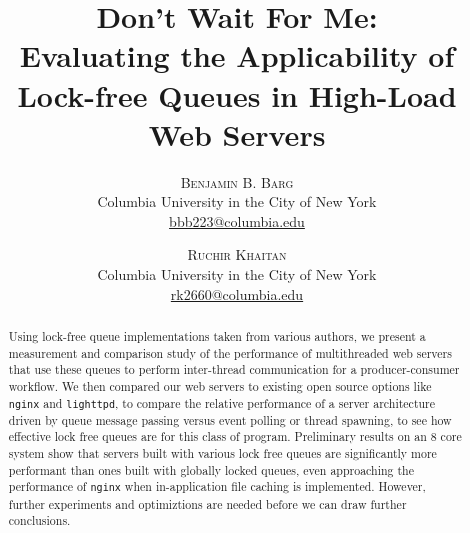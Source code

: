 \documentclass[twoside]{article}
\title{\vspace{-15mm}%
  \fontsize{24pt}{10pt}\selectfont \textbf{Don't Wait For Me:}\\
  \textbf{Evaluating the Applicability of Lock-free Queues in High-Load Web
    Servers} }
\author{%
  \large
  \textsc{Benjamin B. Barg}\\[2mm]
  \normalsize	Columbia University in the City of New York \\
  \normalsize \href{mailto:bbb2123@columbia.edu}{bbb223@columbia.edu}
  \and
  \large
  \textsc{Ruchir Khaitan}\\[2mm]
  \normalsize	Columbia University in the City of New York \\
  \normalsize \href{mailto:rk2660@columbia.edu}{rk2660@columbia.edu}
  \vspace{-5mm} }
\date{}
\begin{document}
\maketitle
\thispagestyle{fancy}

\begin{abstract}
  \noindent Using lock-free queue implementations taken from various
  authors, we present a measurement and comparison study of the
  performance of multithreaded web servers that use these queues to
  perform inter-thread communication for a producer-consumer
  workflow. We then compared our web servers to existing open source
  options like \verb+nginx+ and \verb+lighttpd+, to compare the
  relative performance of a server architecture driven by queue
  message passing versus event polling or thread spawning, to see how
  effective lock free queues are for this class of
  program. Preliminary results on an 8 core system show that servers
  built with various lock free queues are significantly more
  performant than ones built with globally locked queues, even
  approaching the performance of \verb+nginx+ when in-application file
  caching is implemented. However, further experiments and
  optimiztions are needed before we can draw further conclusions.
\end{abstract}
\end{document}
